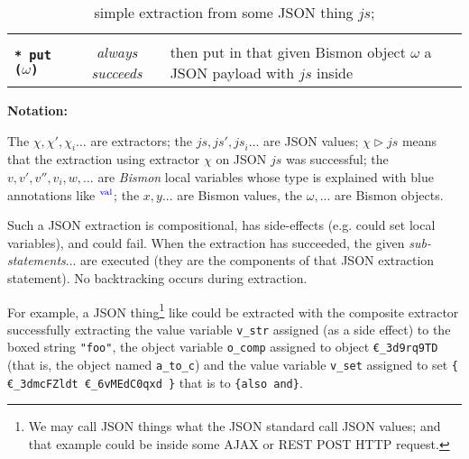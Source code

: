 \begin{table}
\begin{relsize}{-1.3}
\begin{center}
\begin{tabular}{lcp{6.3cm}}
      \rule{0pt}{3ex} \\
      \texttt{\textbf{* put ($\omega$)}} &
        \emph{always succeeds} &
        then put in that given Bismon object $\omega$ a JSON payload with $\mathit{js}$ inside \\
    \end{tabular}
  \end{center}
  \bigskip
  \textbf{Notation:} \hspace{0.6em} \begin{minipage}{0.9\textwidth}
    The $\chi, \chi', \chi_i$... are extractors; the $\mathit{js},
    \mathit{js}', \mathit{js}_i$... are JSON values; $\chi
    \triangleright \mathit{js}$ means that the extraction using
    extractor $\chi$ on JSON $ \mathit{js}$ was successful; the $v,
    v', v'', v_i, w, $... are \emph{Bismon} local variables whose type
    is explained with blue annotations like ${}^{\mathrm{\textcolor{blue}{val}}}$; the $x, y$... are Bismon values, the
    $\omega,$... are Bismon objects.
  \end{minipage}
  \end{relsize}
  \caption{simple extraction from some JSON thing $\mathit{js}$;
    {}
  }
  \label{tbl:extract-json-simple}
  \end{table}

Such a JSON extraction is compositional, has side-effects (e.g. could
set local variables), and could fail. When the extraction has
succeeded, the given \textit{sub-statements}... are executed (they are
the components of that JSON extraction statement). No backtracking
occurs during extraction.

For example, a JSON thing\footnote{We may call JSON things what the
  JSON standard call JSON values; and that example could be inside
  some AJAX or REST POST HTTP request.} like {} could be extracted with the composite extractor
{} successfully extracting
the value variable \texttt{v\_str} assigned (as a side effect) to the
boxed string \texttt{"foo"}, the object variable \texttt{o\_comp}
assigned to object \texttt{€\_3d9rq9TD} (that is, the object named
\texttt{a\_to\_c}) and the value variable \texttt{v\_set} assigned to
set \texttt{\{ €\_3dmcFZldt €\_6vMEdC0qxd \}} that is to
\texttt{\{also and\}}.


